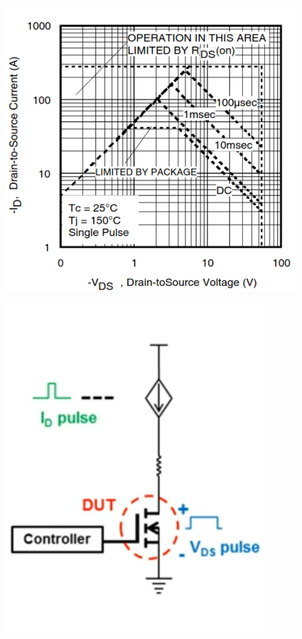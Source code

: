 \documentclass[main.tex]{subfiles}
\begin{document}
    \begin{figure}[!h]
        \centering
        \begin{minipage}{.5\textwidth}
          \centering
          \includegraphics[width=0.8\linewidth]{media/typical_SOA_plot.png}
          \label{fig:typical_SOA_plot}
        \end{minipage}%
        \begin{minipage}{.5\textwidth}
          \centering
          \includegraphics[width=0.8\linewidth]{media/SOA_circuit.png}
          \label{fig:SOA_circuit}
        \end{minipage}
    \end{figure}
\end{document}

